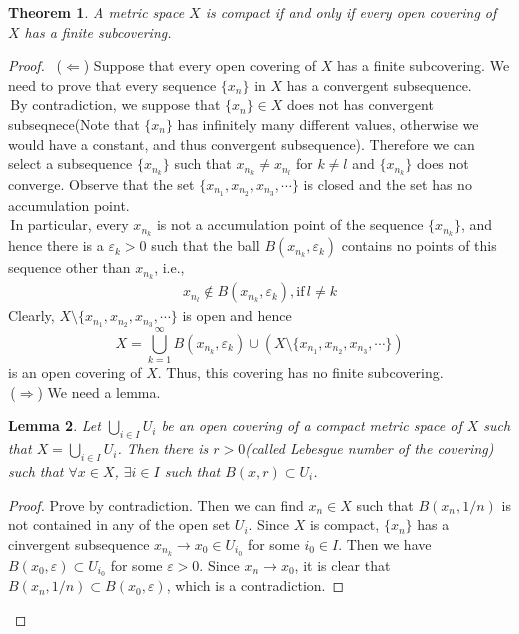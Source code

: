 \documentclass[12pt,leqno]{amsart}
\newtheorem{theorem}{Theorem}[section]
\newtheorem{lemma}[theorem]{Lemma}
\theoremstyle{definition}
\begin{document}
\begin{theorem}\label{finitcover}
A metric space $X$ is compact if and only if every open covering of $X$ has a finite subcovering.
\end{theorem}
\begin{proof}
$ $\newline
\hspace*{1em}\,($\Leftarrow$) Suppose that every open covering of $X$ has a finite subcovering. We need to prove that every sequence $\{x_n\}$ in $X$ has a convergent subsequence. \\
\hspace*{1em}\,By contradiction, we suppose that $\{x_n\}\in X$ does not has convergent subseqnece(Note that $\{x_n\}$ has infinitely many different values, otherwise we would have a constant, and thus convergent subsequence). Therefore we can select a subsequence $\{x_{n_k}\}$ such that $x_{n_k} \neq x_{n_l}$ for $k\neq l$ and $\{x_{n_k}\}$ does not converge. Observe that the set $\{x_{n_1},x_{n_2},x_{n_3},\cdots\}$ is closed and the set has no accumulation point.\\
\hspace*{1em}\,In particular, every $x_{n_k}$ is not a accumulation point of the sequence $\{x_{n_k}\}$, and hence there is a $\varepsilon_k>0$ such that the ball $B(x_{n_k}, \varepsilon_k)$ contains no points of this sequence other than $x_{n_k}$, i.e., 
\begin{align*}
    x_{n_l}\notin B(x_{n_k}, \varepsilon_k), \text{if}\,l\neq k
\end{align*}
Clearly, $X\setminus \{x_{n_1},x_{n_2},x_{n_3},\cdots\}$ is open and hence $$X = \bigcup^\infty_{k=1}B(x_{n_k},\varepsilon_k) \cup \left(X\setminus \{x_{n_1},x_{n_2},x_{n_3},\cdots\}\right)$$ 
is an open covering of $X$. Thus, this covering has no finite subcovering.  \\
\hspace*{1em}\,($\Rightarrow$) We need a lemma.
\begin{lemma}
Let $\bigcup_{i\in I}U_i$ be an open covering of a compact metric space of $X$ such that $X = \bigcup_{i\in I}U_i$. Then there is $r>0$(called Lebesgue number of the covering) such that $\forall x\in X$, $\exists i\in I$ such that $B(x,r)\subset U_i$.
\end{lemma}
\begin{proof}
Prove by contradiction. Then we can find $x_n\in X$ such that $B(x_n,1/n)$ is not contained in any of the open set $U_i$. Since $X$ is compact, $\{x_n\}$ has a cinvergent subsequence $x_{n_k}\to x_0\in U_{i_0}$ for some $i_0\in I$. Then we have $B(x_0, \varepsilon)\subset U_{i_0}$ for some $\varepsilon>0$. Since $x_n\to x_0$, it is clear that $B(x_n,1/n)\subset B(x_0, \varepsilon)$, which is a contradiction.

\end{proof}
\end{proof}
\end{document}
